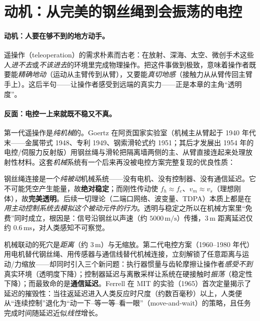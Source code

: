 \section{动机：从完美的钢丝绳到会振荡的电控}
\label{sec:tt-motivation}

\paragraph{动机：人要在够不到的地方动手。}
遥操作（teleoperation）的需求朴素而古老：在放射、深海、太空、微创手术这些人\emph{进不去}或\emph{不该进去}的环境里完成物理操作。把这件事做到极致，意味着操作者既要能\emph{精确地动}（运动从主臂传到从臂），又要能\emph{真切地感}（接触力从从臂传回主臂手上）。这后半句——让操作者感受到远端的真实力——正是本章的主角“透明度”。

\paragraph{反面：电控一上来就既不稳又不真。}
第一代遥操作是\emph{纯机械}的。Goertz 在阿贡国家实验室（机械主从臂起于 1940 年代末——金属带式 1948、专利 1949、钢索滑轮式约 1951；其后才发展出 1954 年的电控/伺服力反射版）用钢丝绳与滑轮把隔离墙两侧的主、从臂直接连起来处理放射性材料\cite{goertz1954mechanical}。这套\emph{机械}系统有一个后来再没被电控方案完整复现的优良性质：

\begin{insight}[机械主从臂为何“完美”]\label{ins:tt-goertz}
钢丝绳连接是一个\emph{纯被动}机械系统——没有电机、没有控制器、没有通信延迟。它不可能凭空产生能量，故\textbf{绝对稳定}；而刚性传动使 $f_h\approx f_e$、$v_m\approx v_s$（理想刚体），故\textbf{完美透明}。后续一切理论（二端口网络、波变量、TDPA）本质上都是在\emph{用主动控制系统去模拟这个被动元件的行为}。透明与稳定之所以在机械方案里“免费”同时成立，根因是：信号沿钢丝以声速（约 $5000\,\mathrm{m/s}$）传播，$3\,\mathrm{m}$ 距离延迟仅约 $0.6\,\mathrm{ms}$，对人类感知不可察觉。
\end{insight}

机械联动的死穴是\emph{距离}（约 $3\,\mathrm{m}$）与无缩放。第二代电控方案（1960--1980 年代）用电机替代钢丝绳、用传感器与通信线替代机械连接，立刻解锁了任意距离与运动/力缩放——却同时引入三个新问题：执行器惯量与齿轮摩擦让操作者\emph{感受不到}真实环境（透明度下降）；控制器延迟与离散采样让系统在硬接触时\emph{振荡}（稳定性下降）；而最致命的是\textbf{通信延迟}。Ferrell 在 MIT 的实验（1965）首次定量揭示了延迟的摧毁性\cite{ferrell1965remote}：当往返延迟进入人类反应时尺度（约数百毫秒）以上，人类便从“连续控制”退化为“动一下--等一等--看一眼”（move-and-wait）的策略，且任务完成时间随延迟近似\emph{线性}增长。

